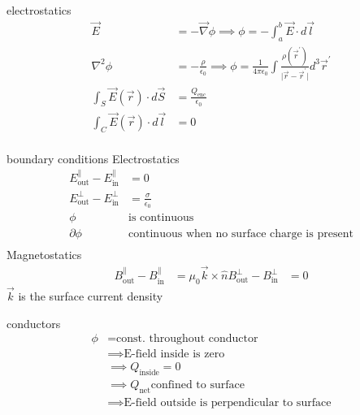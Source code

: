 \documentclass[avery5388, frame, grid]{flashcards}
\begin{document}
\begin{flashcard}{electrostatics}
  {
    \begin{align*}
      \vec{E} &= -\vec{\nabla} \phi \implies \phi = - \int_{a}^{b} \vec{E} \cdot d\vec{l}\\
      \nabla^{2} \phi &= - \frac{\rho}{\epsilon_{0}} \implies
      \phi = \frac{1}{4 \pi \epsilon_{0}} \int \frac{\rho(\vec{r}^{'})}{\lvert \vec{r} - \vec{r}^{'}\lvert} d^{3}\vec{r}^{'}\\
      \int_{S} \vec{E}(\vec{r}) \cdot d\vec{S} &= \frac{Q_{\textrm{enc}}}{\epsilon_{0}}\\
      \int_{C} \vec{E}(\vec{r}) \cdot d\vec{l} &= 0\\
    \end{align*}
  }
\end{flashcard}

\begin{flashcard}{boundary conditions}
  {
    Electrostatics
    \begin{align*}
      E^{\parallel}_{\textrm{out}} - E^{\parallel}_{\textrm{in}} &= 0\\
      E^{\bot}_{\textrm{out}} - E^{\bot}_{\textrm{in}} &= \frac{\sigma}{\epsilon_{0}}\\
      \phi &\textrm{is continuous}\\
      \partial \phi & \textrm{continuous when no surface charge is present}\\
    \end{align*}
    Magnetostatics
    \begin{align*}
      B^{\parallel}_{\textrm{out}} - B^{\parallel}_{\textrm{in}} &= \mu_{0} \vec{k} \times \hat{n}
      B^{\bot}_{\textrm{out}} - B^{\bot}_{\textrm{in}} &= 0
    \end{align*}
    $\vec{k}$ is the surface current density
  }
\end{flashcard}

\begin{flashcard}{conductors}
  {
    \begin{align*}
      \phi &= \textrm{const. throughout conductor}\\
      & \implies \textrm{E-field inside is zero}\\
      & \implies Q_{\textrm{inside}} = 0\\
      & \implies Q_{\textrm{net}} \textrm{confined to surface}\\
      & \implies \textrm{E-field outside is perpendicular to surface}\\
    \end{align*}
  }
\end{flashcard}
\end{document}

